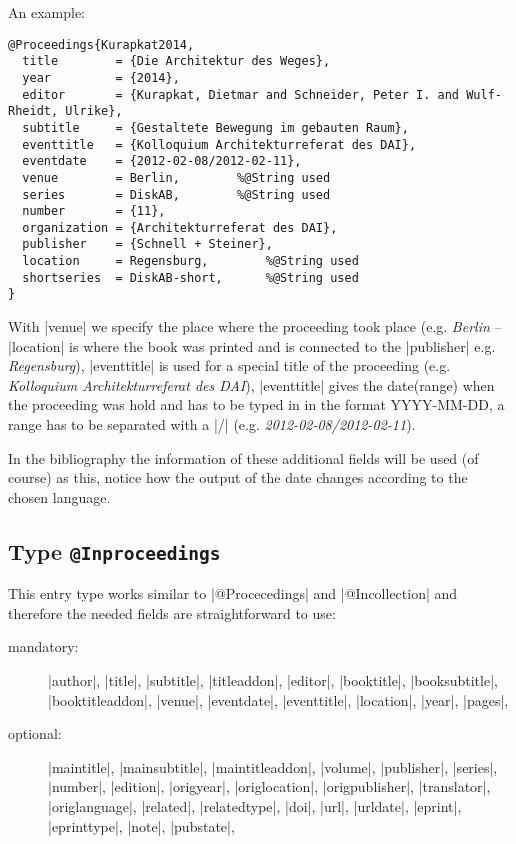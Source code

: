 \documentclass[a4paper,
10pt,
greek,
french,
spanish,
italian,
ngerman,
english
]{ltxdoc}
\begin{document}
An example:
 \begin{lstlisting}[style=bibentry,label=Kurapkat2014,caption={{@}Proceedings\{Kurapkat2014,…\} }]
@Proceedings{Kurapkat2014,
  title        = {Die Architektur des Weges},
  year         = {2014},
  editor       = {Kurapkat, Dietmar and Schneider, Peter I. and Wulf-Rheidt, Ulrike},
  subtitle     = {Gestaltete Bewegung im gebauten Raum},
  eventtitle   = {Kolloquium Architekturreferat des DAI},
  eventdate    = {2012-02-08/2012-02-11},
  venue        = Berlin, 		%@String used
  series       = DiskAB,		%@String used
  number       = {11},
  organization = {Architekturreferat des DAI},
  publisher    = {Schnell + Steiner},
  location     = Regensburg, 		%@String used
  shortseries  = DiskAB-short,		%@String used
}
\end{lstlisting}
With |venue| we specify the place where the proceeding took place (e.g. \emph{Berlin} -- |location| is where the book was printed and is connected to the |publisher| e.g. \emph{Regensburg}),
|eventtitle| is used for a special title of the proceeding (e.g. \emph{Kolloquium Architekturreferat des DAI}),
|eventtitle| gives the date(range) when the proceeding was hold and has to be typed in in the format YYYY-MM-DD, a range has to be separated with a |/| (e.g.  \emph{2012-02-08/2012-02-11}).

In the bibliography the information of these additional fields will be used (of course) as this, notice how the output of the date changes according to the chosen language.

\subsection{Type \texttt{@Inproceedings}}\label{inproceedings}
This entry type works similar to |@Procecedings| and |@Incollection| and therefore the needed fields are straightforward to use:

\begin{description}
\item[mandatory:] 
|author|, |title|, |subtitle|, |titleaddon|,
|editor|,  |booktitle|, |booksubtitle|, |booktitleaddon|,
|venue|, |eventdate|, |eventtitle|,
|location|, |year|, |pages|, 
\item[optional:]
|maintitle|, |mainsubtitle|, |maintitleaddon|, |volume|, 
|publisher|, |series|, |number|, |edition|, 
|origyear|, |origlocation|, |origpublisher|, 
|translator|, |origlanguage|,
|related|, |relatedtype|,
|doi|, |url|, |urldate|, |eprint|, |eprinttype|, |note|, |pubstate|, 
\end{description}
 
\end{document}
